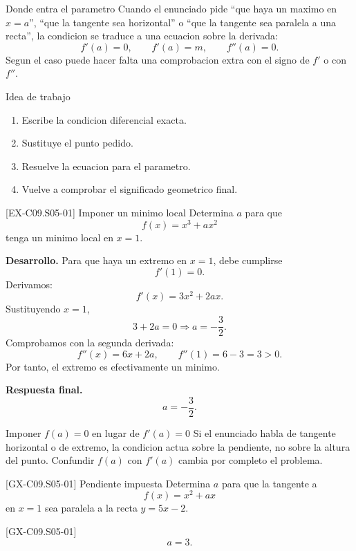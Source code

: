 \begin{theorybox}{Donde entra el parametro}
Cuando el enunciado pide ``que haya un maximo en \(x=a\)'', ``que la tangente sea horizontal''
o ``que la tangente sea paralela a una recta'', la condicion se traduce a una ecuacion sobre la
derivada:
\[
f'(a)=0,\qquad f'(a)=m,\qquad f''(a)=0.
\]
Segun el caso puede hacer falta una comprobacion extra con el signo de \(f'\) o con \(f''\).
\end{theorybox}

\begin{methodbox}{Idea de trabajo}
\begin{enumerate}
  \item Escribe la condicion diferencial exacta.
  \item Sustituye el punto pedido.
  \item Resuelve la ecuacion para el parametro.
  \item Vuelve a comprobar el significado geometrico final.
\end{enumerate}
\end{methodbox}

\begin{solvedexample}{[EX-C09.S05-01] Imponer un minimo local}
Determina \(a\) para que
\[
f(x)=x^3+ax^2
\]
tenga un minimo local en \(x=1\).

\textbf{Desarrollo.} Para que haya un extremo en \(x=1\), debe cumplirse
\[
f'(1)=0.
\]
Derivamos:
\[
f'(x)=3x^2+2ax.
\]
Sustituyendo \(x=1\),
\[
3+2a=0 \Longrightarrow a=-\frac{3}{2}.
\]
Comprobamos con la segunda derivada:
\[
f''(x)=6x+2a,\qquad f''(1)=6-3=3>0.
\]
Por tanto, el extremo es efectivamente un minimo.

\textbf{Respuesta final.}
\[
a=-\frac{3}{2}.
\]
\end{solvedexample}

\begin{commonerror}{Imponer \(f(a)=0\) en lugar de \(f'(a)=0\)}
Si el enunciado habla de tangente horizontal o de extremo, la condicion actua sobre la
pendiente, no sobre la altura del punto. Confundir \(f(a)\) con \(f'(a)\) cambia por completo
el problema.
\end{commonerror}

\begin{guidedexercise}{[GX-C09.S05-01] Pendiente impuesta}
Determina \(a\) para que la tangente a
\[
f(x)=x^2+ax
\]
en \(x=1\) sea paralela a la recta \(y=5x-2\).
\end{guidedexercise}

\begin{shortanswer}{[GX-C09.S05-01]}
\[
a=3.
\]
\end{shortanswer}

